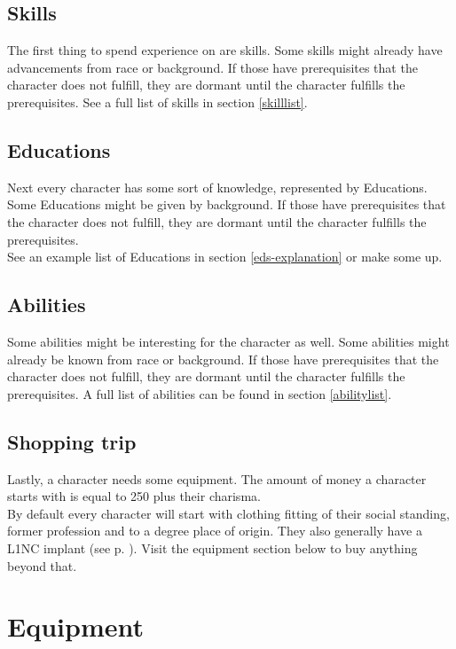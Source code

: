 \documentclass[12pt,a4paper,openany,dvipsnames]{book}
\begin{document}
	\section{Skills}
	The first thing to spend experience on are skills. Some skills might already have advancements from race or background. If those have prerequisites that the character does not fulfill, they are dormant until the character fulfills the prerequisites. See a full list of skills in section \ref{skilllist}.
	\section{Educations}
	Next every character has some sort of knowledge, represented by Educations.
	Some Educations might be given by background.
	If those have prerequisites that the character does not fulfill,
		they are dormant until the character fulfills the prerequisites.\\
	See an example list of Educations in section \ref{eds-explanation} or make some up.
	\section{Abilities}
	Some abilities might be interesting for the character as well. Some abilities might already be known from race or background. If those have prerequisites that the character does not fulfill, they are dormant until the character fulfills the prerequisites. A full list of abilities can be found in section \ref{abilitylist}.
	\section{Shopping trip}
	Lastly, a character needs some equipment. The amount of money a character starts with is equal to 250 plus their charisma. \\
	By default every character will start with clothing fitting of their social standing, former profession and to a degree place of origin.
	They also generally have a L1NC implant (see p. \pageref{implant:l1nc}).
	Visit the equipment section below to buy anything beyond that.

	\chapter{Equipment}
	
	
	
	
	
	
\end{document}
